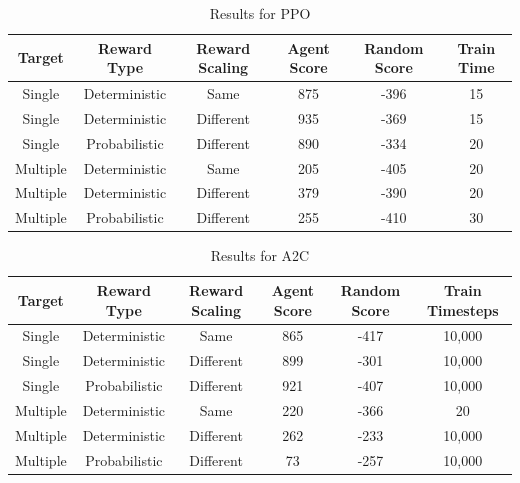 \documentclass{article}
\begin{document}
    \begin{table}[h]
        \centering
        \caption[]{Results for PPO}\label{Results for PPO}%
        \begin{tabular}{cccccc}
            \toprule
            Target & Reward Type & Reward Scaling\footnotemark[1] & Agent Score\footnotemark[2] & Random Score\footnotemark[2] & Train Time\footnotemark[3]\\
            \midrule
            Single &  Deterministic & Same & 875 & -396 & 15\\
            Single & Deterministic & Different\footnotemark[4] & 935 & -369 & 15\\
            Single & Probabilistic & Different & 890 & -334 & 20\\
            \midrule
            Multiple & Deterministic & Same & 205 & -405 & 20\\
            Multiple & Deterministic & Different & 379 & -390 & 20\\
            Multiple & Probabilistic & Different & 255 & -410 & 30\\
            \bottomrule
        \end{tabular}
        \label{tab: PPO_Table}
    \end{table}

    \begin{table}[h]
        \centering
        \caption[]{Results for A2C}\label{Results for A2C}%
        \begin{tabular}{cccccc}
            \toprule
            Target & Reward Type & Reward Scaling\footnotemark & Agent Score\footnotemark & Random Score\footnotemark & Train Timesteps\footnotemark\\
            \midrule
            Single &  Deterministic & Same & 865 & -417 & 10,000\\
            Single & Deterministic & Different\footnotemark & 899 & -301 & 10,000\\
            Single & Probabilistic & Different & 921 & -407 & 10,000\\
            \midrule
            Multiple & Deterministic & Same & 220 & -366 & 20\\
            Multiple & Deterministic & Different & 262 & -233 & 10,000\\
            Multiple & Probabilistic & Different & 73 & -257 & 10,000\\
            \bottomrule
        \end{tabular}
        \label{tab: A2C_Table}
    \end{table}
\end{document}
